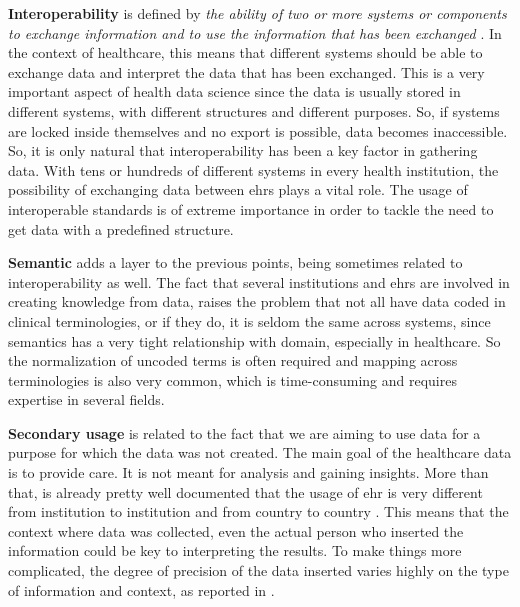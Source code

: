 \textbf{Interoperability} is defined by \textit{the ability of two or more systems or components to exchange information and to use the information that has been exchanged} \cite{182763}. In the context of healthcare, this means that different systems should be able to exchange data and interpret the data that has been exchanged. This is a very important aspect of health data science since the data is usually stored in different systems, with different structures and different purposes. So, if systems are locked inside themselves and no export is possible, data becomes inaccessible. So, it is only natural that interoperability has been a key factor in gathering data. With tens or hundreds of different systems in every health institution, the possibility of exchanging data between \acp{ehr} plays a vital role. The usage of interoperable standards is of extreme importance in order to tackle the need to get data with a predefined structure.


\textbf{Semantic} adds a layer to the previous points, being sometimes related to interoperability as well. The fact that several institutions and \acp{ehr} are involved in creating knowledge from data, raises the problem that not all have data coded in clinical terminologies, or if they do, it is seldom the same across systems, since semantics has a very tight relationship with domain, especially in healthcare. So the normalization of uncoded terms is often required and mapping across terminologies is also very common, which is time-consuming and requires expertise in several fields.



\textbf{Secondary usage} is related to the fact that we are aiming to use data for a purpose for which the data was not created. The main goal of the healthcare data is to provide care. It is not meant for analysis and gaining insights. More than that, is already pretty well documented that the usage of \ac{ehr} is very different from institution to institution and from country to country \cite{anckerHowElectronicHealth2014,weiskopfMethodsDimensionsElectronic2013a,peekThreeControversiesHealth2018}. This means that the context where data was collected, even the actual person who inserted the information could be key to interpreting the results. To make things more complicated, the degree of precision of the data inserted varies highly on the type of information and context, as reported in \cite{cruz-correiaDataQualityIntegration2009}. 



